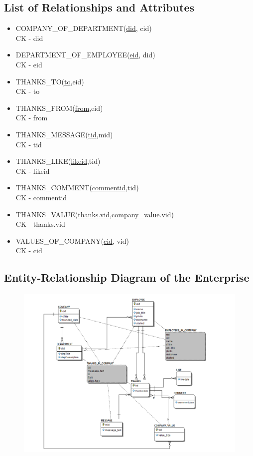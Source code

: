 \documentclass[11pt]{report}
\begin{document}
\subsection{List of Relationships and Attributes}
\begin{itemize}
\item COMPANY\_OF\_DEPARTMENT(\underline{did}, cid) \\
CK - did \\
\item DEPARTMENT\_OF\_EMPLOYEE(\underline{eid}, did) \\
CK - eid \\
\item THANKS\_TO(\underline{to},eid) \\
CK - to\\
\item THANKS\_FROM(\underline{from},eid) \\
CK - from\\
\item THANKS\_MESSAGE(\underline{tid},mid) \\
CK - tid\\
\item THANKS\_LIKE(\underline{likeid},tid) \\
CK - likeid\\
\item THANKS\_COMMENT(\underline{commentid},tid) \\
CK - commentid\\
\item THANKS\_VALUE(\underline{thanks.vid},company\_value.vid) \\
CK - thanks.vid\\
\item VALUES\_OF\_COMPANY(\underline{cid}, vid) \\
CK - cid
\end{itemize}
\clearpage

\subsection{Entity-Relationship Diagram of the Enterprise}

\begin{figure}[!htb]
\centering
\includegraphics[scale=.7]{./images/erd11-25.PNG}
\end{figure}
\clearpage
\end{document}
